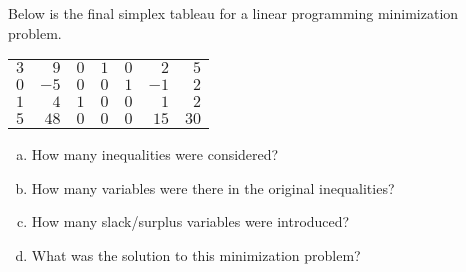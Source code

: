 \documentclass[11pt,letterpaper]{article}
\begin{document}
\newpage



 Below is the final simplex tableau for a linear programming minimization problem. \par
	\begin{table}[H]
	\centering
	\begin{tabular}{rrrrrrr}
	$3$ & $9$ & $0$ & $1$ & $0$ & $2$ & $5$ \\
	$0$ & $-5$ & $0$ & $0$ & $1$ & $-1$ & $2$ \\
	$1$ & $4$ & $1$ & $0$ & $0$ & $1$ & $2$ \\
	$5$ & $48$ & $0$ & $0$ & $0$ & $15$ & $30$
	\end{tabular}
	\end{table}

\begin{enumerate}[(a)]
\item How many inequalities were considered?
\item How many variables were there in the original inequalities?
\item How many slack/surplus variables were introduced?
\item What was the solution to this minimization problem?
\end{enumerate} \pspace
\end{document}
